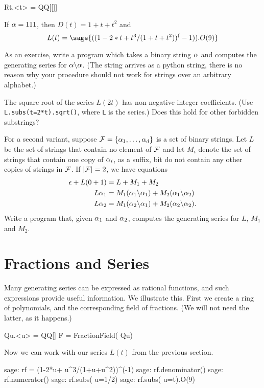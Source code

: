 \begin{sageblock}
    Rt.<t> = QQ[[]]
\end{sageblock}

If $\alpha=111$, then $D(t)=1+t+t^2$ and 
\[
    L(t) = \sage{((1-2*t+ t^3/(1+t+t^2))^(-1)).O(9)}
\]

As an exercise, write a program which takes a binary string $\alpha$ and
computes the generating series for $\alpha\backslash\alpha$. (The string arrives
as a python string, there is no reason why your procedure should not work
for strings over an arbitrary alphabet.)

The square root of the series $L(2t)$ has non-negative integer coefficients.
(Use \verb|L.subs(t=2*t).sqrt()|, where \verb|L| is the series.)
Does this hold for other forbidden substrings?

For a second variant, suppose ${\mathcal F}=\{\alpha_{1},\ldots,\alpha_{d}\}$ is a set of binary strings. 
Let $L$ be the set of strings that contain no element of ${\mathcal F}$ and let $M_i$ 
denote the set of strings that contain one copy of $\alpha_i$, as a suffix, bit do not
contain any other copies of strings in ${\mathcal F}$. If $|{\mathcal F}|=2$, we have
equations
\begin{align*}
    \epsilon+L(0+1) &= L +M_1 +M_2\\
    L\alpha_1 &= M_1(\alpha_1\backslash\alpha_1) +M_2(\alpha_1\backslash\alpha_2)\\
    L\alpha_2 &= M_1(\alpha_2\backslash\alpha_1) +M_2(\alpha_2\backslash\alpha_2).
\end{align*}
Write a program that, given $\alpha_1$ and $\alpha_2$, computes the generating
series for $L$, $M_1$ and $M_2$.


\section{Fractions and Series}

Many generating series can be expressed as rational functions, and 
such expressions provide useful information. We illustrate this.
First we create a ring of polynomials, and the corresponding field
of fractions. (We will not need the latter, as it happens.)

\begin{sageblock}
    Qu.<u> = QQ[]
    F = FractionField( Qu)
\end{sageblock}

Now we can work with our series $L(t)$ from the previous section.

\begin{sageexample}
sage: rf = (1-2*u+ u^3/(1+u+u^2))^(-1)
sage: rf.denominator()
sage: rf.numerator()
sage: rf.subs( u=1/2)
sage: rf.subs( u=t).O(9)
\end{sageexample}

